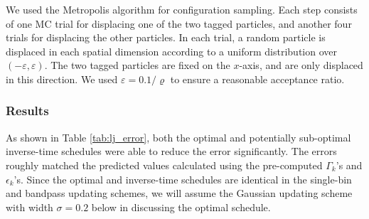 \documentclass[reprint, superscriptaddress, floatfix]{revtex4-1}
\begin{document}
We used the Metropolis algorithm\cite{frenkel, metropolis1953}
for configuration sampling.
%
Each step consists of
one MC trial for displacing one of the two tagged particles,
and another four trials for displacing the other particles.
%
In each trial,
a random particle is displaced in each spatial dimension
according to a uniform distribution over $(-\varepsilon, \varepsilon)$.
%
The two tagged particles are fixed on the $x$-axis,
and are only displaced in this direction.
%
We used $\varepsilon = 0.1/\varrho$
to ensure a reasonable acceptance ratio.



\subsubsection{Results}




As shown in Table \ref{tab:lj_error},
both the optimal and potentially sub-optimal inverse-time schedules
were able to reduce the error significantly.
%
The errors roughly matched the predicted values
calculated using the pre-computed
$\Gamma_k$'s and $\epsilon_k$'s.
%
Since the optimal and inverse-time schedules are identical
in the single-bin and bandpass updating schemes,
we will assume the Gaussian updating scheme with width $\sigma = 0.2$ below
in discussing the optimal schedule.
\end{document}
